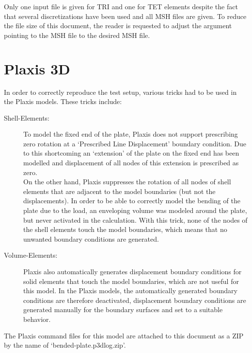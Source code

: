 
Only one input file is given for TRI and one for TET elements despite the fact
that several discretizations have been used and all MSH files are given. To
reduce the file size of this document, the reader is requested to adjust the
argument pointing to the MSH file  to the desired
MSH file.

\section{Plaxis 3D}
\label{bended-plate:sec:plaxis3D}

In order to correctly reproduce the test setup, various tricks had to be used
in the Plaxis models. These tricks include:

\begin{description}
    \item [Shell-Elements:]{To model the fixed end of the plate, Plaxis does not
          support prescribing zero rotation at a ‘Prescribed Line
          Displacement’ boundary condition. Due to this shortcoming
          an ‘extension’ of the plate on the fixed end has been
          modelled and displacement of all nodes of this extension is
          prescribed as zero.\\
          On the other hand, Plaxis suppresses the rotation of all nodes
          of shell elements that are adjacent to the model boundaries (but
          not the displacements). In order to be able to correctly model the
          bending of the plate due to the load, an enveloping volume was
          modeled around the plate, but never activated in the calculation.
          With this trick, none of the nodes of the shell elements touch the
          model boundaries, which means that no unwanted boundary conditions
          are generated.}
    \item [Volume-Elements:]{Plaxis also automatically generates displacement
          boundary conditions for solid elements that touch the model boundaries,
          which are not useful for this model. In the Plaxis models, the
          automatically generated boundary conditions are therefore deactivated,
          displacement boundary conditions are generated manually for the
          boundary surfaces and set to a suitable behavior.}
\end{description}

The Plaxis command files for this model are attached to this document as a ZIP
by the name of ‘bended-plate.p3dlog.zip’.

